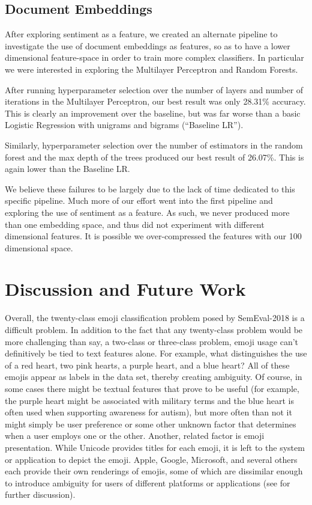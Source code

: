 \documentclass[11pt]{article}
\begin{document}
\subsection{Document Embeddings}

After exploring sentiment as a feature, we created an alternate pipeline to investigate the use of document embeddings as features, so as to have a lower dimensional feature-space in order to train more complex classifiers. In particular we were interested in exploring the Multilayer Perceptron and Random Forests.

After running hyperparameter selection over the number of layers and number of iterations in the Multilayer Perceptron, our best result was only 28.31\% accuracy. This is clearly an improvement over the baseline, but was far worse than a basic Logistic Regression with unigrams and bigrams (``Baseline LR'').

Similarly, hyperparameter selection over the number of estimators in the random forest and the max depth of the trees produced our best result of 26.07\%. This is again lower than the Baseline LR.

We believe these failures to be largely due to the lack of time dedicated to this specific pipeline. Much more of our effort went into the first pipeline and exploring the use of sentiment as a feature. As such, we never produced more than one embedding space, and thus did not experiment with different dimensional features. It is possible we over-compressed the features with our 100 dimensional space.

\section{Discussion and Future Work}
Overall, the twenty-class emoji classification problem posed by SemEval-2018 is a difficult problem. In addition to the fact that any twenty-class problem would be more challenging than say, a two-class or three-class problem, emoji usage can't definitively be tied to text features alone. For example, what distinguishes the use of a red heart, two pink hearts, a purple heart, and a blue heart? All of these emojis appear as labels in the data set, thereby creating ambiguity. Of course, in some cases there might be textual features that prove to be useful (for example, the purple heart might be associated with military terms and the blue heart is often used when supporting awareness for autism), but more often than not it might simply be user preference or some other unknown factor that determines when a user employs one or the other. Another, related factor is emoji presentation. While Unicode provides titles for each emoji, it is left to the system or application to depict the emoji. Apple, Google, Microsoft, and several others each provide their own renderings of emojis, some of which are dissimilar enough to introduce ambiguity for users of different platforms or applications (see \cite{miller2016blissfully} for further discussion).
\end{document}
